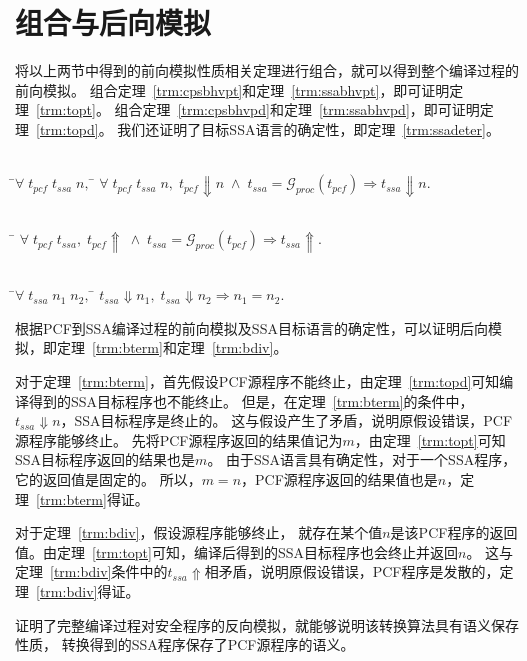 \section{组合与后向模拟}

将以上两节中得到的前向模拟性质相关定理进行组合，就可以得到整个编译过程的前向模拟。
组合定理~\ref{trm:cpsbhvpt}和定理~\ref{trm:ssabhvpt}，即可证明定理~\ref{trm:topt}。
组合定理~\ref{trm:cpsbhvpd}和定理~\ref{trm:ssabhvpd}，即可证明定理~\ref{trm:topd}。
我们还证明了目标SSA语言的确定性，即定理~\ref{trm:ssadeter}。

  \begin{theorem}[SSA程序对PCF程序终止行为的保存]\label{trm:topt} 
    \begin{tabbing}
     \\
    \quad\=$\forall \; t_{pcf}\; t_{ssa}\; n,\; $\=\kill
    \>$\forall \; t_{pcf}\; t_{ssa}\; n,\; t_{pcf}\Downarrow n\; \wedge \; t_{ssa}=\mathcal{G}_{proc}(t_{pcf}) \Longrightarrow t_{ssa}\Downarrow n.$
    \end{tabbing}
  \end{theorem}
  
  \begin{theorem}[SSA程序对PCF程序发散行为的保存]\label{trm:topd}
    \begin{tabbing}
      \\
    \quad\=\kill
    \>$\forall \; t_{pcf}\; t_{ssa},\; t_{pcf}\Uparrow\; \wedge \; t_{ssa}=\mathcal{G}_{proc}(t_{pcf})\Longrightarrow t_{ssa}\Uparrow.$
    \end{tabbing}
  \end{theorem}  

  \begin{theorem}[SSA语言的确定性]\label{trm:ssadeter} 
    \begin{tabbing}
     \\
    \quad\=$\forall \; t_{ssa}\; n_1\; n_2,\; $\=\kill
    \>$t_{ssa}\Downarrow n_1,\; t_{ssa}\Downarrow n_2 \Longrightarrow n_1 = n_2.$
    \end{tabbing}
  \end{theorem}

根据PCF到SSA编译过程的前向模拟及SSA目标语言的确定性，可以证明后向模拟，即定理~\ref{trm:bterm}和定理~\ref{trm:bdiv}。

对于定理~\ref{trm:bterm}，首先假设PCF源程序不能终止，由定理~\ref{trm:topd}可知编译得到的SSA目标程序也不能终止。
但是，在定理~\ref{trm:bterm}的条件中，$t_{ssa}\Downarrow n$，SSA目标程序是终止的。
这与假设产生了矛盾，说明原假设错误，PCF源程序能够终止。
先将PCF源程序返回的结果值记为$m$，由定理~\ref{trm:topt}可知SSA目标程序返回的结果也是$m$。
由于SSA语言具有确定性，对于一个SSA程序，它的返回值是固定的。
所以，$m=n$，PCF源程序返回的结果值也是$n$，定理~\ref{trm:bterm}得证。

对于定理~\ref{trm:bdiv}，假设源程序能够终止，
就存在某个值$n$是该PCF程序的返回值。由定理~\ref{trm:topt}可知，编译后得到的SSA目标程序也会终止并返回$n$。
这与定理~\ref{trm:bdiv}条件中的$t_{ssa}\Uparrow$相矛盾，说明原假设错误，PCF程序是发散的，定理~\ref{trm:bdiv}得证。

证明了完整编译过程对安全程序的反向模拟，就能够说明该转换算法具有语义保存性质，
转换得到的SSA程序保存了PCF源程序的语义。
